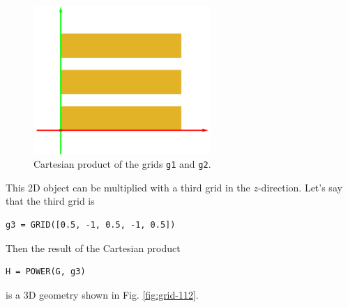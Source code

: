 \begin{figure}[!ht]
\begin{center}
\includegraphics[width=0.6\textwidth]{img/grid-111.png}
\end{center}
\vspace{-4mm}
\caption{Cartesian product of the grids {\tt g1} and {\tt g2}.}
\label{fig:grid-111}
\end{figure}
\noindent
This 2D object can be multiplied with a third grid in the $z$-direction.
Let's say that the third grid is \\

\begin{bbox}
\begin{verbatim}
g3 = GRID([0.5, -1, 0.5, -1, 0.5])
\end{verbatim}
\end{bbox}
\vspace{6mm}

\noindent
Then the result of the Cartesian product \\

\begin{bbox}
\begin{verbatim}
H = POWER(G, g3)
\end{verbatim}
\end{bbox}
\vspace{6mm}

\noindent
is a 3D geometry shown in Fig. \ref{fig:grid-112}.
\newpage

